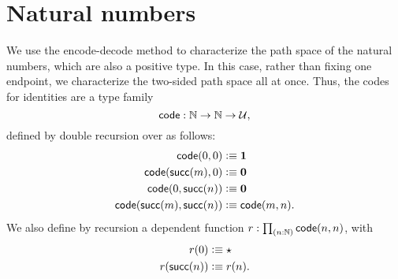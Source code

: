 \section{Natural numbers}
\label{sec:compute-nat}

%
%
We use the encode-decode method to characterize the path space of the natural numbers, which are also a positive type.
In this case, rather than fixing one endpoint, we characterize the two-sided path space all at once.
Thus, the codes for identities are a type family
\[\mathsf{code}:\mathbb{N}\to\mathbb{N}\to\mathcal{U},\]
defined by double recursion over \N as follows:
\begin{align*}
  \mathsf{code}(0,0) &\vcentcolon\equiv \mathbf{1}\\
  \mathsf{code}(\mathsf{succ}(m),0) &\vcentcolon\equiv \mathbf{0}\\
  \mathsf{code}(0,\mathsf{succ}(n)) &\vcentcolon\equiv \mathbf{0}\\
  \mathsf{code}(\mathsf{succ}(m),\mathsf{succ}(n)) &\vcentcolon\equiv \mathsf{code}(m,n).
\end{align*}
We also define by recursion a dependent function $r:\prd{n:\N} \code(n,n)$, with
\begin{align*}
  r(0) &\vcentcolon\equiv \star\\
  r(\mathsf{succ}(n)) &\vcentcolon\equiv r(n).
\end{align*}


